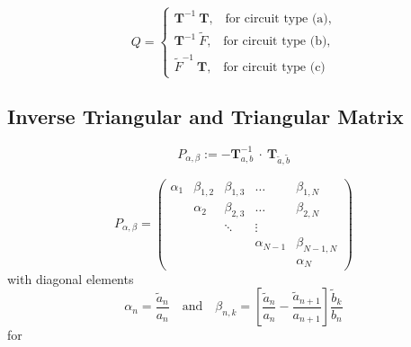 \documentclass[a4paper, 10pt, twoside, twocolumn]{scrartcl}
\begin{document}
\begin{equation}
	Q = \begin{cases}
		\mathbf{T}^{-1} ~ \mathbf{T} \text{,} \quad \text{for circuit type (a),} \\
		\mathbf{T}^{-1} ~ \tilde{F} \text{,} \quad \text{for circuit type (b),} \\
		\tilde{F}^{-1} ~ \mathbf{T} \text{,} \quad \text{for circuit type (c)}
	\end{cases}
\end{equation}

\subsection*{Inverse Triangular and Triangular Matrix}

\begin{equation}
	P_{\alpha,\beta} := - \mathbf{T}_{a,b}^{-1} ~ \cdot ~ \mathbf{T}_{\tilde{a},\tilde{b}}
\end{equation}

\begin{equation}
	P_{\alpha,\beta} = 
	\begin{pmatrix}
		\alpha_{1} & \beta_{1,2} &  \beta_{1,3} & \ldots &   \beta_{1,N} \\
		& \alpha_{2} & \beta_{2,3} &  \ldots &  \beta_{2,N} \\
		& & \ddots & \vdots \\
		& & & \alpha_{N-1} & \beta_{N-1,N} \\
		& & & & \alpha_{N}
	\end{pmatrix}
\end{equation}
with diagonal elements
\begin{equation}
	\alpha_{n} = \frac{\tilde{a}_{n}}{a_{n}} \quad \text{and} \quad \beta_{n,k} = \left[\frac{\tilde{a}_{n}}{a_{n}} - \frac{\tilde{a}_{n+1}}{a_{n+1}} \right] \frac{\tilde{b}_{k}}{b_{n}}
\end{equation}
for 
\end{document}
